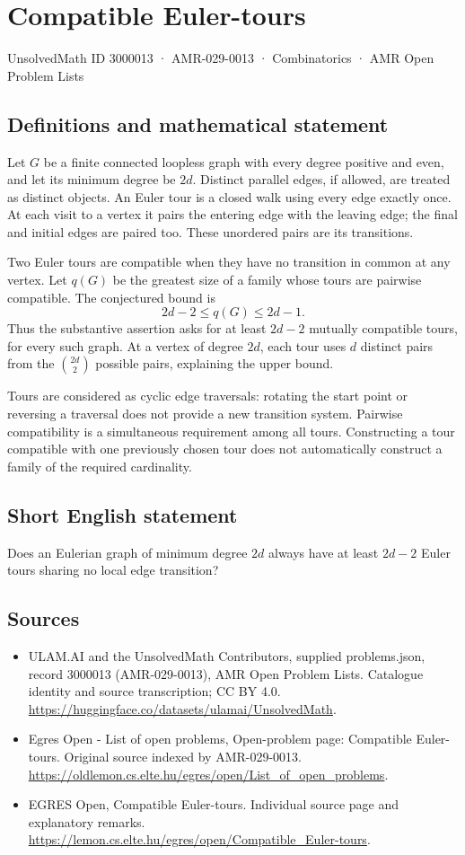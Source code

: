 \documentclass[11pt,a4paper]{article}
\begin{document}
\section*{Compatible Euler-tours}\label{3000013}
{\small UnsolvedMath ID 3000013 · AMR-029-0013 · Combinatorics · AMR Open Problem Lists}
\subsection{Definitions and mathematical statement}
Let $G$ be a finite connected loopless graph with every degree positive
and even, and let its minimum degree be $2d$. Distinct parallel edges,
if allowed, are treated as distinct objects. An Euler tour is a closed
walk using every edge exactly once. At each visit to a vertex it pairs
the entering edge with the leaving edge; the final and initial edges
are paired too. These unordered pairs are its transitions.

Two Euler tours are compatible when they have no transition in common
at any vertex. Let $q(G)$ be the greatest size of a family whose tours
are pairwise compatible. The conjectured bound is
\[
                         2d-2\le q(G)\le2d-1.
\]
Thus the substantive assertion asks for at least $2d-2$ mutually
compatible tours, for every such graph. At a vertex of degree $2d$, each
tour uses $d$ distinct pairs from the $\binom{2d}{2}$ possible pairs,
explaining the upper bound.

Tours are considered as cyclic edge traversals: rotating the start point
or reversing a traversal does not provide a new transition system.
Pairwise compatibility is a simultaneous requirement among all tours.
Constructing a tour compatible with one previously chosen tour does
not automatically construct a family of the required cardinality.
\subsection{Short English statement}
Does an Eulerian graph of minimum degree $2d$ always have at least
$2d-2$ Euler tours sharing no local edge transition?
\subsection{Sources}
\begin{itemize}
\item[S1] ULAM.AI and the UnsolvedMath Contributors, supplied problems.json, record 3000013 (AMR-029-0013), AMR Open Problem Lists. Catalogue identity and source transcription; CC BY 4.0.
\url{https://huggingface.co/datasets/ulamai/UnsolvedMath}.
\item[S2] Egres Open - List of open problems, Open-problem page: Compatible Euler-tours. Original source indexed by AMR-029-0013.
\url{https://oldlemon.cs.elte.hu/egres/open/List_of_open_problems}.
\item[S3] EGRES Open, Compatible Euler-tours. Individual source page and explanatory remarks.
\url{https://lemon.cs.elte.hu/egres/open/Compatible_Euler-tours}.
\end{itemize}
\end{document}
